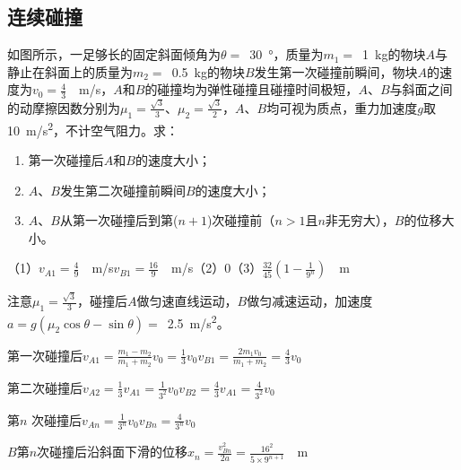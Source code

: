 \subsection{连续碰撞}

\begin{proset}
    如图所示，一足够长的固定斜面倾角为\(\theta =\) \,\qty{30}{\degree}，质量为\(m_1 =\) \,\qty{1}{kg}的物块\(A\)与静止在斜面上的质量为\(m_2 =\) \,\qty{0.5}{kg}的物块\(B\)发生第一次碰撞前瞬间，物块\(A\)的速度为\(v_0 = \frac{4}{3}\) \,\qty{}{m/s}，\(A\)和\(B\)的碰撞均为弹性碰撞且碰撞时间极短，\(A\)、\(B\)与斜面之间的动摩擦因数分别为\(\mu_1 = \frac{\sqrt{3}}{3}\)、\(\mu_2 = \frac{\sqrt{3}}{2} \)，\(A\)、\(B\)均可视为质点，重力加速度\(g\)取\,\qty{10}{m/s^2}，不计空气阻力。求：
    \begin{enumerate}[(1)]
        \item 第一次碰撞后\(A\)和\(B\)的速度大小；
        \item \(A\)、\(B\)发生第二次碰撞前瞬间\(B\)的速度大小；
        \item \(A\)、\(B\)从第一次碰撞后到第(\(n + 1\))次碰撞前（\(n > 1\)且\(n\)非无穷大），\(B\)的位移大小。
    \end{enumerate}
\end{proset}
\begin{answer}
    （1）\(v_{A1} = \frac{4}{9}\) \,\qty{}{m/s}\quad \(v_{B1} = \frac{16}{9}\) \,\qty{}{m/s}（2）0（3）\(\frac{32}{45}(1 - \frac{1}{9^n})\) \,\qty{}{m}

    注意\(\mu_1 = \frac{\sqrt{3}}{3} \)，碰撞后\(A\)做匀速直线运动，\(B\)做匀减速运动，加速度\(a = g(\mu_2\cos\theta - \sin\theta) =\) \,\qty{2.5}{m/s^2}。

    第一次碰撞后\(v_{A1} = \frac{m_1 - m_2}{m_1 + m_2}v_0 = \frac{1}{3}v_0\)\quad \(v_{B1} = \frac{2m_1v_0}{m_1 + m_2} = \frac{4}{3}v_0\)

    第二次碰撞后\(v_{A2} = \frac{1}{3}v_{A1} = \frac{1}{3^2}v_0\)\quad \(v_{B2}= \frac{4}{3}v_{A1} = \frac{4}{3^2}v_0\)

    第\(n\) 次碰撞后\(v_{An} = \frac{1}{3^n}v_0\)\quad \(v_{Bn} = \frac{4}{3^n}v_0\)

    \(B\)第\(n\)次碰撞后沿斜面下滑的位移\(x_n = \frac{v_{Bn}^2}{2a} = \frac{16^2}{5 \times 9^{n + 1}}\) \,\qty{}{m}
\end{answer}